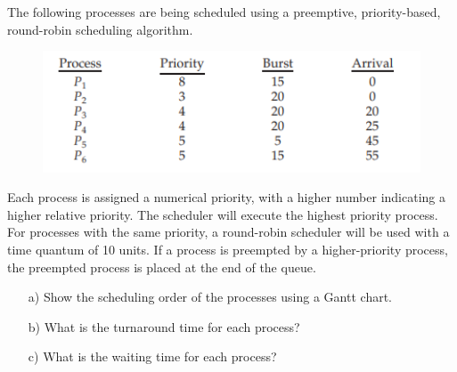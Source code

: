 \begin{exercise}[]{

    The following processes are being scheduled using a preemptive, priority-based, round-robin scheduling algorithm.
    \begin{figure}[h]
        \begin{center}
            \includegraphics[width=120mm]{a1.png}
        \end{center}\end{figure}
    Each process is assigned a numerical priority, with a higher number indicating a higher relative priority. The scheduler will execute the highest priority process. For processes with the same priority, a round-robin scheduler will be used with a time quantum of 10 units. If a process is
    preempted by a higher-priority process, the preempted process is placed at the end of the queue.
    \begin{enumerate}
        \item [a)]
        Show the scheduling order of the processes using a Gantt chart.
       
       \item [b)]
        What is the turnaround time for each process?
       
       \item [c)]
        What is the waiting time for each process?
    \end{enumerate}

}
\end{exercise}
